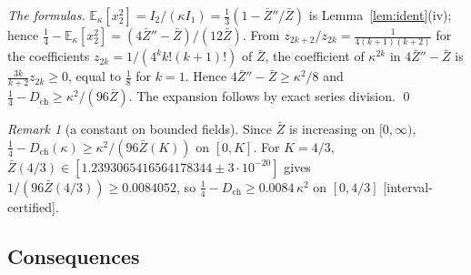 \documentclass[11pt,a4paper]{article}
\theoremstyle{remark}
\newtheorem{remark}[theorem]{Remark}
\theoremstyle{definition}
\theoremstyle{plain}
\theoremstyle{remark}
\newcommand{\E}{\mathbb{E}}
\newcommand{\st}[1]{\textsf{[#1]}}
\newcommand{\Zb}{\bar Z}
\newcommand{\Dch}{D_{\mathrm{ch}}}
\begin{document}
\emph{The formulas.} $\E_\kappa[x_2^2]=I_2/(\kappa I_1)=\frac13(1-\Zb''/\Zb)$ is Lemma~\ref{lem:ident}(iv); hence
$\frac14-\E_\kappa[x_2^2]=(4\Zb''-\Zb)/(12\Zb)$. From $z_{2k+2}/z_{2k}=\frac1{4(k+1)(k+2)}$ for the coefficients $z_{2k}=1/(4^kk!(k+1)!)$ of $\Zb$,
the coefficient of $\kappa^{2k}$ in $4\Zb''-\Zb$ is $\frac{3k}{k+2}z_{2k}\ge0$, equal to $\frac18$ for $k=1$. Hence $4\Zb''-\Zb\ge\kappa^2/8$ and
$\frac14-\Dch\ge\kappa^2/(96\Zb)$. The expansion follows by exact series division. \qed

\begin{remark}[a constant on bounded fields]\label{rem:const}
Since $\Zb$ is increasing on $[0,\infty)$, $\frac14-\Dch(\kappa)\ge\kappa^2/(96\Zb(K))$ on $[0,K]$. For $K=4/3$, $\Zb(4/3)\in[1.2393065416564178344\pm3\cdot10^{-20}]$ gives
$1/(96\Zb(4/3))\ge0.0084052$, so $\frac14-\Dch\ge0.0084\,\kappa^2$ on $[0,4/3]$ \st{interval-certified}.
\end{remark}

\subsection{Consequences}\label{sec:chcons}
\end{document}
